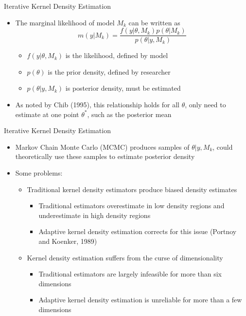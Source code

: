 \documentclass{beamer}
\begin{document}
\begin{frame}{Iterative Kernel Density Estimation}
\begin{itemize}
	\item The marginal likelihood of model $M_k$ can be written as $$m(y|M_k) = \frac{f(y|\theta, M_k)p(\theta|M_k)}{p(\theta|y, M_k)}$$
		\begin{itemize}
			\item $f(y|\theta, M_k)$ is the likelihood, defined by model
			\item $p(\theta)$ is the prior density, defined by researcher
			\item $p(\theta|y, M_k)$ is posterior density, must be estimated
		\end{itemize}
	\item As noted by Chib (1995), this relationship holds for all $\theta$, only need to estimate at one point $\theta^*$, such as the posterior mean
\end{itemize}
\end{frame}

\begin{frame}{Iterative Kernel Density Estimation}
\begin{itemize}
	\item Markov Chain Monte Carlo (MCMC) produces samples of $\theta|y, M_k$, could theoretically use these samples to estimate posterior density
	\item Some problems:
		\begin{itemize}
			\item Traditional kernel density estimators produce biased density estimates
				\begin{itemize}
					\item Traditional estimators overestimate in low density regions and underestimate in high density regions
					\item Adaptive kernel density estimation corrects for this issue (Portnoy and Koenker, 1989)
				\end{itemize}
			\item Kernel density estimation suffers from the curse of dimensionality
				\begin{itemize}
					\item Traditional estimators are largely infeasible for more than six dimensions
					\item Adaptive kernel density estimation is unreliable for more than a few dimensions
				\end{itemize}
		\end{itemize}
\end{itemize}
\end{frame}
\end{document}
